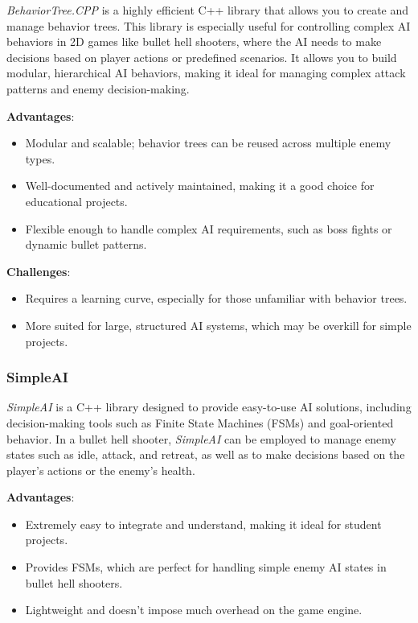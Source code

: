 \textit{BehaviorTree.CPP} is a highly efficient C++ library that allows you to create and manage behavior trees. This library is especially useful for controlling complex AI behaviors in 2D games like bullet hell shooters, where the AI needs to make decisions based on player actions or predefined scenarios. It allows you to build modular, hierarchical AI behaviors, making it ideal for managing complex attack patterns and enemy decision-making.

\textbf{Advantages}:
\begin{itemize}
    \item Modular and scalable; behavior trees can be reused across multiple enemy types.
    \item Well-documented and actively maintained, making it a good choice for educational projects.
    \item Flexible enough to handle complex AI requirements, such as boss fights or dynamic bullet patterns.
\end{itemize}

\textbf{Challenges}:
\begin{itemize}
    \item Requires a learning curve, especially for those unfamiliar with behavior trees.
    \item More suited for large, structured AI systems, which may be overkill for simple projects.
\end{itemize}

\subsubsection{SimpleAI}

\textit{SimpleAI} is a C++ library designed to provide easy-to-use AI solutions, including decision-making tools such as Finite State Machines (FSMs) and goal-oriented behavior. In a bullet hell shooter, \textit{SimpleAI} can be employed to manage enemy states such as idle, attack, and retreat, as well as to make decisions based on the player's actions or the enemy’s health.

\textbf{Advantages}:
\begin{itemize}
    \item Extremely easy to integrate and understand, making it ideal for student projects.
    \item Provides FSMs, which are perfect for handling simple enemy AI states in bullet hell shooters.
    \item Lightweight and doesn’t impose much overhead on the game engine.
\end{itemize}

